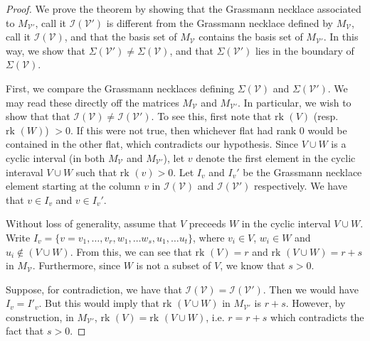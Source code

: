 \documentclass[11pt]{article}
\newcommand{\rk}{\textrm{rk }}
\newcommand{\cV}{\mathcal{V}}
\newcommand{\cI}{\mathcal{I}}
\newcommand{\cB}{\mathcal{B}}
\theoremstyle{remark}
\theoremstyle{definition}
\begin{document}
\begin{proof} 
We prove the theorem by showing that the Grassmann necklace associated to $M_{\cV'}$, call it $\cI(\cV')$ is different from the Grassmann necklace defined by $M_{\cV}$, call it $\cI(\cV)$, and that the basis set of $M_{\cV}$ contains the basis set of $M_{\cV'}$. In this way, we show that $\Sigma(\cV') \neq \Sigma(\cV)$, and that  $\Sigma(\cV')$ lies in the boundary of $\Sigma(\cV)$. 

First, we compare the Grassmann necklaces defining $\Sigma(\cV)$ and $\Sigma(\cV')$. We may read these directly off the matrices $M_{\cV}$ and $M_{\cV'}$. In particular, we wish to show that that $\cI(\cV) \neq \cI(\cV')$. To see this, first note that $\rk(V)$ (resp. $\rk(W)$) $>0$. If this were not true, then whichever flat had rank $0$ would be contained in the other flat, which contradicts our hypothesis. Since $V \cup W$ is a cyclic interval (in both $M_\cV$ and $M_{\cV'}$), let $v$ denote the first element in the cyclic interaval $V\cup W$ such that $\rk(v) >0$. Let $I_v$ and $I_v'$ be the Grassmann necklace element starting at the column $v$ in $\cI(\cV)$ and $\cI(\cV')$ respectively. We have that $v \in I_v$ and $v \in I_v'$. 

Without loss of generality, assume that $V$ preceeds $W$ in the cyclic interval $V \cup W$. Write $I_v = \{v = v_1, \ldots, v_r, w_1, \ldots w_s, u_1, \ldots u_t\}$, where $v_i \in V$, $w_i \in W$ and $u_i \not \in (V \cup W)$. From this, we can see that $\rk(V) = r$ and $\rk(V\cup W) = r+s$ in $M_\cV$. Furthermore, since $W$ is not a subset of $V$, we know that $s > 0$. 

Suppose, for contradiction, we have that $\cI(\cV) = \cI(\cV')$. Then we would have $I_v = I'_v$. But this would imply that $\rk(V \cup W)$ in $M_{\cV'}$ is $r+ s$. However, by construction, in $M_{\cV'}$, $\rk(V) = \rk(V\cup W)$, i.e. $r = r+s$ which contradicts the fact that $s > 0$. 

\begin{comment}
 inote that some vertex of $V$ (resp. $W$)  appears at least once in $\cI(C)$. To see this, note that any element that does not ever appear in $\cI(C)$ has rank $0$. Since neither $V$ nor $W$ has rank $0$, they must each contain at least one element that appears in $\cI(C)$. Therefore, we know that there exists some $I_j \in \cI(C)$ such that $I_j \cap W \neq \emptyset$. Fix such a $j$ and let $a \in  I_j \cap W$ be an element of $W$ that is in said $I_j$. Let $I'_j$ be the correposponding element of $\cI(C')$. We claim that $I_j \neq I_j'$. That is, the $j^{th}$ minor in $\cI(C')$ is not the same as the $j^{th}$ minor of $\cI(C)$. This shows that $M(C)$ and $M(C')$ define two different positroid cells. Then it remains to show that the the basis set $\cB$ of $M(C)$ contains the basis set $\cB'$ of $M(C')$. 


\end{comment}
\end{proof}
\end{document}
